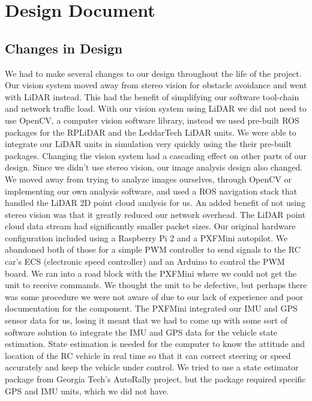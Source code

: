 \documentclass[compsoc,draftclsnofoot,onecolumn,10pt]{IEEEtran}
\begin{document}
\clearpage
\section{Design Document}
\subsection{Changes in Design}
We had to make several changes to our design throughout the life of the project.
Our vision system moved away from stereo vision for obstacle avoidance and went with LiDAR instead.
This had the benefit of simplifying our software tool-chain and network traffic load.
With our vision system using LiDAR we did not need to use OpenCV, a computer vision software library, instead we used pre-built ROS packages for the RPLiDAR and the LeddarTech LiDAR units. We were able to integrate our LiDAR units in simulation very quickly using the their pre-built packages.
Changing the vision system had a cascading effect on other parts of our design.
Since we didn't use stereo vision, our image analysis design also changed. \\
We moved away from trying to analyze images ourselves, through OpenCV or implementing our own analysis software, and used a ROS navigation stack that handled the LiDAR 2D point cloud analysis for us. An added benefit of not using stereo vision was that it greatly reduced our network overhead. The LiDAR point cloud data stream had significantly smaller packet sizes.
Our original hardware configuration included using a Raspberry Pi 2 and a PXFMini autopilot.
We abandoned both of those for a simple PWM controller to send signals to the RC car's ECS (electronic speed controller) and an Arduino to control the PWM board.
We ran into a road block with the PXFMini where we could not get the unit to receive commands.
We thought the unit to be defective, but perhaps there was some procedure we were not aware of due to our lack of experience and poor documentation for the component.
The PXFMini integrated our IMU and GPS sensor data for us, losing it meant that we had to come up with some sort of software solution to integrate the IMU and GPS data for the vehicle state estimation.
State estimation is needed for the computer to know the attitude and location of the RC vehicle in real time so that it can correct steering or speed accurately and keep the vehicle under control.
We tried to use a state estimator package from Georgia Tech's AutoRally project, but the package required specific GPS and IMU units, which we did not have.\\
\end{document}
